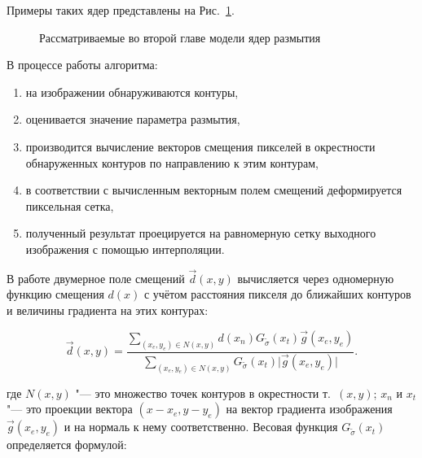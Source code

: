 \noindent Примеры таких ядер представлены на Рис.~\ref{fig:sinopsis-warping-blur}.

\begin{figure}[ht]
	\caption{Рассматриваемые во второй главе модели ядер размытия}
	\label{fig:sinopsis-warping-blur}
\end{figure}

В процессе работы алгоритма:
\begin{enumerate}[beginpenalty=10000]
	\item на изображении обнаруживаются контуры,
	\item оценивается значение параметра размытия,
	\item производится вычисление векторов смещения пикселей в окрестности обнаруженных контуров по направлению к этим контурам,
	\item в соответствии с вычисленным векторным полем смещений деформируется пиксельная сетка,
	\item полученный результат проецируется на равномерную сетку выходного изображения с помощью интерполяции.
\end{enumerate}

В работе двумерное поле смещений $\vec{d}\left(x,y\right)$ вычисляется через одномерную функцию смещения $d\left(x\right)$ с учётом расстояния пикселя до ближайших контуров и величины градиента на этих контурах:

\begin{equation*}
	\vec{d}\left(x,y\right) = \frac{\sum_{\left(x_e,y_e\right) \in N\left(x,y\right)}{d\left(x_n\right) G_{\widetilde{\sigma}}\left(x_t\right) \vec{g}\left(x_e,y_e\right) }} {\sum_{\left(x_e,y_e\right) \in N\left(x,y\right)}{G_{\widetilde{\sigma}}\left(x_t\right)\lvert \vec{g}\left(x_e,y_e\right) \rvert}}.
\end{equation*}

\noindent где $N\left(x,y\right)$ "--- это множество точек контуров в окрестности т.~$\left(x, y\right)$; $x_n$ и $x_t$ "--- это проекции вектора $\left(x-x_e, y-y_e\right)$ на вектор градиента изображения $\vec{g}\left(x_e,y_e\right)$ и на нормаль к нему соответственно. Весовая функция $G_{\widetilde{\sigma}}\left(x_t\right)$ определяется формулой:


